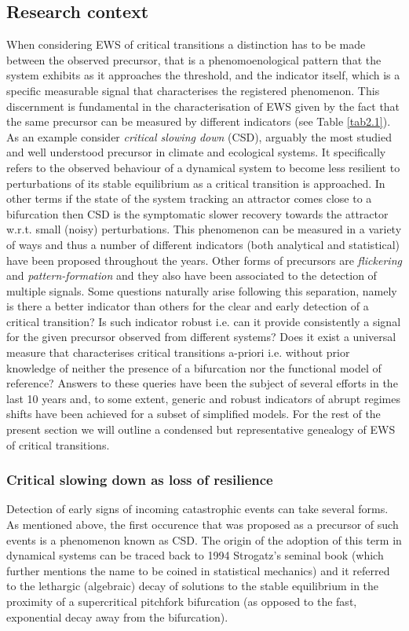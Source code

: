\documentclass[../main.tex]{subfiles}
\begin{document}
\subsection{Research context}\label{subsec1.2}
When considering EWS of critical transitions a distinction has to be made between the observed precursor, that is a phenomoenological pattern that the system exhibits as it approaches the threshold, and the indicator itself, which is a specific measurable signal that characterises the registered phenomenon.
This discernment is fundamental in the characterisation of EWS given by the fact that the same precursor can be measured by different indicators (see Table \ref{tab2.1}).
As an example consider \textit{critical slowing down} (CSD), arguably the most studied and well understood precursor in climate and ecological systems. 
It specifically refers to the observed behaviour of a dynamical system to become less resilient to perturbations of its stable equilibrium as a critical transition is approached. 
In other terms if the state of the system tracking an attractor comes close to a bifurcation then CSD is the symptomatic slower recovery towards the attractor w.r.t. small (noisy) perturbations.
This phenomenon can be measured in a variety of ways and thus a number of different indicators (both analytical and statistical) have been proposed throughout the years.
Other forms of precursors are \textit{flickering} and \textit{pattern-formation} and they also have been associated to the detection of multiple signals.
Some questions naturally arise following this separation, namely is there a better indicator than others for the clear and early detection of a critical transition? 
Is such indicator robust i.e. can it provide consistently a signal for the given precursor observed from different systems? 
Does it exist a universal measure that characterises critical transitions a-priori i.e. without prior knowledge of neither the presence of a bifurcation nor the functional model of reference?
Answers to these queries have been the subject of several efforts in the last 10 years and, to some extent, generic and robust indicators of abrupt regimes shifts have been achieved for a subset of simplified models.
For the rest of the present section we will outline a condensed but representative genealogy of EWS of critical transitions.
\subsubsection{Critical slowing down as loss of resilience}\label{subsubsec1.2.1}
Detection of early signs of incoming catastrophic events can take several forms. As mentioned above, the first occurence that was proposed as a precursor of such events is a phenomenon known as CSD.
The origin of the adoption of this term in dynamical systems can be traced back to 1994 Strogatz's seminal book \cite{Strogatz94} (which further mentions the name to be coined in statistical mechanics) and it referred to the lethargic (algebraic) decay of solutions to the stable equilibrium in the proximity of a supercritical pitchfork bifurcation (as opposed to the fast, exponential decay away from the bifurcation). 
\end{document}
